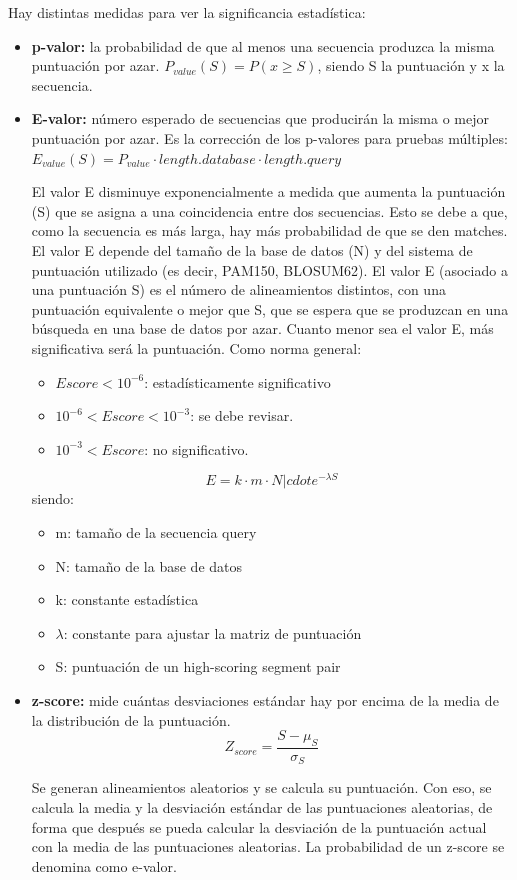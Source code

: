 Hay distintas medidas para ver la significancia estadística:
\begin{itemize}
\item \textbf{p-valor:} la probabilidad de que al menos una secuencia produzca la misma puntuación por azar. $P_{value} (S) = P(x \geq S)$, siendo S la puntuación y x la secuencia.

\item \textbf{E-valor:} número esperado de secuencias que producirán la misma o mejor puntuación por azar. Es la corrección de los p-valores para pruebas múltiples: $E_{value}(S) = P_{value} \cdot length.database \cdot length.query$

El valor E disminuye exponencialmente a medida que aumenta la puntuación (S) que se asigna a una coincidencia entre dos secuencias. Esto se debe a que, como la secuencia es más larga, hay más probabilidad de que se den matches. El valor E depende del tamaño de la base de datos (N) y del sistema de puntuación utilizado (es decir, PAM150, BLOSUM62). El valor E (asociado a una puntuación S) es el número de alineamientos distintos, con una puntuación equivalente o mejor que S, que se espera que se produzcan en una búsqueda en una base de datos por azar. Cuanto menor sea el valor E, más significativa será la puntuación. Como norma general:
\begin{itemize}
\item $Escore < 10^{-6}$: estadísticamente significativo
\item $10^{-6} < Escore < 10^{-3}$: se debe revisar.
\item $10^{-3} < Escore$: no significativo.
\end{itemize}

$$E = k \cdot m \cdot N |cdot e^{-\lambda S}$$
siendo:
\begin{itemize}
\item m: tamaño de la secuencia query
\item N: tamaño de la base de datos
\item k: constante estadística
\item $\lambda$: constante para ajustar la matriz de puntuación
\item S: puntuación de un high-scoring segment pair
\end{itemize}

\item \textbf{z-score:} mide cuántas desviaciones estándar hay por encima de la media de la distribución de la puntuación.
$$Z_{score} = \frac{S - \mu_S}{\sigma_S}$$

Se generan alineamientos aleatorios y se calcula su puntuación. Con eso, se calcula la media y la desviación estándar de las puntuaciones aleatorias, de forma que después se pueda calcular la desviación de la puntuación actual con la media de las puntuaciones aleatorias. La probabilidad de un z-score se denomina como e-valor.
\end{itemize}

